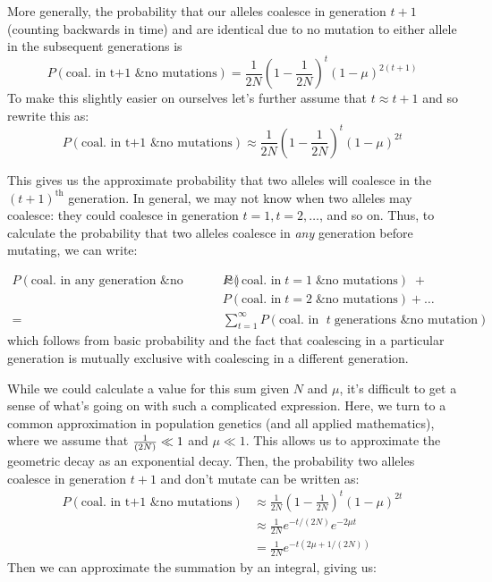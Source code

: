 More generally, the probability that our alleles coalesce in generation
$t+1$ (counting backwards in time) and are identical due to no mutation to either allele in the
subsequent generations is
%
\begin{equation}
P(\textrm{coal. in t+1 \& no mutations}) =  \frac{1}{2N} \left(1- \frac{1}{2N} \right)^t \left(1-\mu \right)^{2(t+1)}
\end{equation}
%
To make this slightly easier on ourselves let's further assume that $t
\approx t+1$ and so rewrite this as:
\begin{equation}
P(\textrm{coal. in t+1 \& no mutations}) \approx \frac{1}{2N} \left(1- \frac{1}{2N} \right)^t \left(1-\mu \right)^{2t}
\end{equation}
%

This gives us the approximate probability that two alleles will coalesce in the
$(t+1)^\text{th}$ generation. In general, we may not know when two alleles may
coalesce: they could coalesce in generation $t=1, t=2, \ldots $, and so on.
Thus, to calculate the probability that two alleles coalesce in \emph{any}
generation before mutating, we can write:

\begin{align*}
  P(\textrm{coal. in any generation \& no mutations}) \approx & P(\textrm{coal. in} \; t=1 \; \textrm{\& no mutations}) \; + \\ 
&  P(\textrm{coal. in} \; t=2 \; \textrm{\& no mutations}) + \ldots \\
  = & \sum_{t=1}^\infty P(\textrm{coal. in } \; t \; \textrm{generations \& no mutation})
\end{align*}
%
which follows from basic probability and the fact that coalescing in a particular generation is mutually exclusive with coalescing in a different generation.

While we could calculate a value for this sum given $N$ and $\mu$, it's
difficult to get a sense of what's going on with such a complicated expression.
Here, we turn to a common approximation in population genetics (and all applied
mathematics), where we assume that $\nicefrac{1}{(2N)} \ll 1$ and $\mu \ll 1$.
This allows us to approximate the geometric decay as an exponential decay.
Then, the probability two alleles coalesce in generation $t+1$ and don't mutate
can be written as:
%
\begin{align} P(\textrm{coal. in t+1 \& no mutations}) &\approx \frac{1}{2N}
\left(1- \frac{1}{2N} \right)^t \left(1-\mu \right)^{2t} \\ 
& \approx \frac{1}{2N} e^{-t/(2N)} e^{-2\mu t } \\
&=\frac{1}{2N} e^{-t(2\mu+1/(2N))} \end{align} 
%
Then we can approximate the summation by an integral, giving us:
%

